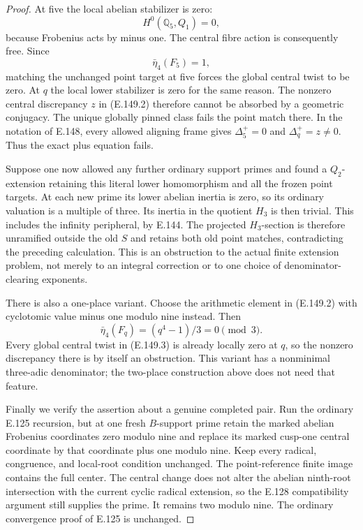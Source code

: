 \begin{proof}
At five the local abelian stabilizer
is zero:
\[
 H^0(\mathbb Q_5,Q_1)=0,
 \]
because Frobenius acts by minus one.
The central fibre action is consequently
free. Since
\[
                       \bar\eta_4(F_5)=1,
 \]
matching the unchanged point target
at five forces the global central
twist to be zero.
At \(q\) the local lower stabilizer
is zero for the same reason.
The nonzero central discrepancy \(z\)
in (E.149.2) therefore cannot be
absorbed by a geometric conjugacy.
The unique globally pinned class
fails the point match there.
In the notation of E.148, every
allowed aligning frame gives
\(\Delta_5^+=0\) and
\(\Delta_q^+=z\ne0\).
Thus the exact plus equation fails.

Suppose one now allowed any further
ordinary support primes and found
a \(Q_2\)-extension retaining this
literal lower homomorphism and all
the frozen point targets.
At each new prime its lower
abelian inertia is zero, so its
ordinary valuation is a multiple
of three. Its inertia in the
quotient \(H_3\) is then trivial.
This includes the infinity
peripheral, by E.144.
The projected \(H_3\)-section is
therefore unramified outside the
old \(S\) and retains both old
point matches, contradicting the
preceding calculation.
This is an obstruction to the
actual finite extension problem,
not merely to an integral
correction or to one choice of
denominator-clearing exponents.

There is also a one-place variant.
Choose the arithmetic element in
(E.149.2) with cyclotomic value
minus one modulo nine instead.
Then
\[
                  \bar\eta_4(F_q)
                        =(q^4-1)/3=0\pmod3.
 \]
Every global central twist in
(E.149.3) is already locally zero
at \(q\), so the nonzero discrepancy
there is by itself an obstruction.
This variant has a nonminimal
three-adic denominator; the
two-place construction above does
not need that feature.

Finally we verify the assertion
about a genuine completed pair.
Run the ordinary E.125 recursion,
but at one fresh \(B\)-support
prime retain the marked abelian
Frobenius coordinates zero modulo
nine and replace its marked
cusp-one central coordinate by
that coordinate plus one modulo
nine. Keep every radical, congruence,
and local-root condition unchanged.
The point-reference finite image
contains the full center.
The central change does not alter
the abelian ninth-root intersection
with the current cyclic radical
extension, so the E.128 compatibility
argument still supplies the prime.
It remains two modulo nine.
The ordinary convergence proof of
E.125 is unchanged.


\end{proof}
